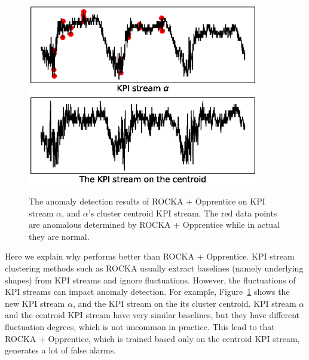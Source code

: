 \begin{figure}
\setlength{\abovecaptionskip}{-0.1cm}
      \begin{minipage}[h]{1.0\linewidth}
      \centering
      \includegraphics[width=0.9\textwidth]{fig/kpi_evaluation.eps}\\
      \end{minipage}
      \caption{The anomaly detection results of ROCKA + Opprentice on KPI stream $\alpha$, and $\alpha$'s cluster centroid KPI stream.
      The red data points are anomalous determined by ROCKA + Opprentice while in actual they are normal.
      }
      \label{fig:centroid_and_curve}
      \vspace{-6 mm}
\end{figure}

Here we explain why \name{} performs better than ROCKA + Opprentice.
KPI stream clustering methods such as ROCKA usually extract baselines (namely underlying shapes) from KPI streams and ignore fluctuations.
However, the fluctuations of KPI streams can impact anomaly detection.
For example, Figure~\ref{fig:centroid_and_curve} shows the new KPI stream $\alpha$, and the KPI stream on the its cluster centroid.
KPI stream $\alpha$ and the centroid KPI stream have very similar baselines, but they have different fluctuation degrees, which is not uncommon in practice.
This lead to that ROCKA + Opprentice, which is trained based only on the centroid KPI stream, generates a lot of false alarms.

